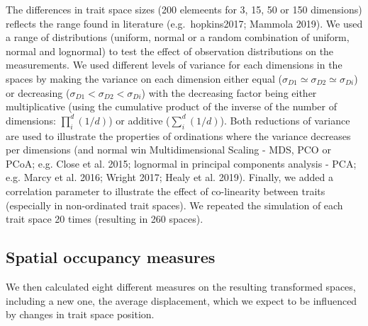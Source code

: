 \documentclass[]{article}
\begin{document}
The differences in trait space sizes (200 elemeents for 3, 15, 50 or 150
dimensions) reflects the range found in literature (e.g.~hopkins2017;
Mammola 2019). We used a range of distributions (uniform, normal or a
random combination of uniform, normal and lognormal) to test the effect
of observation distributions on the measurements. We used different
levels of variance for each dimensions in the spaces by making the
variance on each dimension either equal
(\(\sigma_{D1} \simeq \sigma_{D2} \simeq \sigma_{Di}\)) or decreasing
(\(\sigma_{D1} < \sigma_{D2} < \sigma_{Di}\)) with the decreasing factor
being either multiplicative (using the cumulative product of the inverse
of the number of dimensions: \(\prod_i^d(1/d)\)) or additive
(\(\sum_i^d(1/d)\)). Both reductions of variance are used to illustrate
the properties of ordinations where the variance decreases per
dimensions (and normal win Multidimensional Scaling - MDS, PCO or PCoA;
e.g. Close et al. 2015; lognormal in principal components analysis -
PCA; e.g. Marcy et al. 2016; Wright 2017; Healy et al. 2019). Finally,
we added a correlation parameter to illustrate the effect of
co-linearity between traits (especially in non-ordinated trait spaces).
We repeated the simulation of each trait space 20 times (resulting in
260 spaces).

\subsection{Spatial occupancy
measures}\label{spatial-occupancy-measures}

We then calculated eight different measures on the resulting transformed
spaces, including a new one, the average displacement, which we expect
to be influenced by changes in trait space position.

\renewcommand\baselinestretch{1}\selectfont
\end{document}
